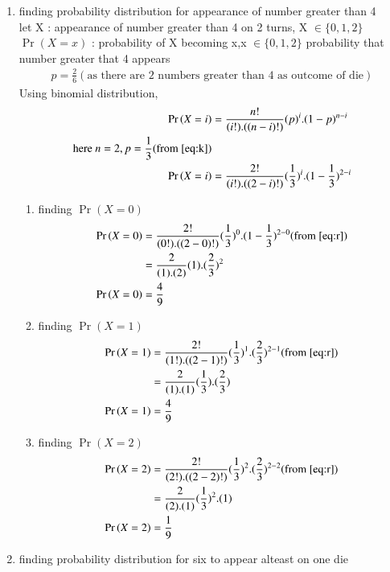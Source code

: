 \documentclass[journal,12pt,onecolumn]{IEEEtran}
\providecommand{\pr}[1]{\ensuremath{\Pr\left(#1\right)}}
\theoremstyle{remark}
\begin{document}
\begin{enumerate}
\item finding probability distribution for appearance of number greater than 4\\
let X : appearance of number greater than 4 on 2 turns,
X $\in \{ 0,1,2 \}$ \\
$\pr{X=x}$ : probability of X becoming x,x $\in \{ 0,1,2 \}$
probability that number greater that 4 appears 
\begin{align}
p=\frac{2}{6}(\text{as there are 2 numbers greater than  4 as outcome of die})\label{eq:k} 
\end{align}
Using binomial distribution,
\begin{align}
\pr{X=i}&=\frac{n!}{(i!).((n-i)!)}(p)^i.(1-p)^{n-i}\\
\text{here } n=2,p=\frac{1}{3}  (\text{from } \eqref{eq:k})\\
\pr{X=i}&=\frac{2!}{(i!).((2-i)!)}(\frac{1}{3})^i.(1-\frac{1}{3})^{2-i} \label{eq:r}
\end{align}
\begin{enumerate}
\item finding $\pr{X=0}$
\begin{align}
\pr{X=0}&=\frac{2!}{(0!).((2-0)!)}(\frac{1}{3})^0.(1-\frac{1}{3})^{2-0} (\text{from } \eqref{eq:r})\\
&= \frac{2}{(1).(2)}(1).(\frac{2}{3})^{2}    \\
\pr{X=0}&=\frac{4}{9}
\end{align}
\item finding $\pr{X=1}$
\begin{align}
\pr{X=1}&=\frac{2!}{(1!).((2-1)!)}(\frac{1}{3})^{1}.(\frac{2}{3})^{2-1}(\text{from } \eqref{eq:r})\\
&=\frac{2}{(1).(1)}(\frac{1}{3}).(\frac{2}{3})\\
\pr{X=1}&=\frac{4}{9}
\end{align}
\item finding $\pr{X=2}$
\begin{align}
\pr{X=2}&=\frac{2!}{(2!).((2-2)!)}(\frac{1}{3})^{2}.(\frac{2}{3})^{2-2}(\text{from } \eqref{eq:r})\\
&= \frac{2}{(2).(1)}(\frac{1}{3})^{2}.(1)    \\
\pr{X=2}&=\frac{1}{9}
\end{align}
\end{enumerate}
\item finding probability distribution for six to appear alteast on one die\\

\end{enumerate}
\end{document}
